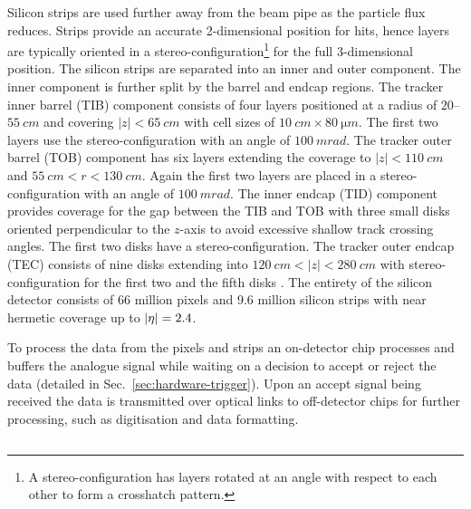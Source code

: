 Silicon strips are used further away from the beam pipe as the particle flux reduces. Strips provide an accurate 2-dimensional position for hits, hence layers are typically oriented in a stereo-configuration\footnote{A stereo-configuration has layers rotated at an angle with respect to each other to form a crosshatch pattern.} for the full 3-dimensional position. The silicon strips are separated into an inner and outer component. The inner component is further split by the barrel and endcap regions. The tracker inner barrel (TIB) component consists of four layers positioned at a radius of $20$--${\SI{55}{cm}}$ and covering ${|z|<\SI{65}{cm}}$ with cell sizes of ${\SI{10}{cm}\times\SI{80}{\micro m}}$. The first two layers use the stereo-configuration with an angle of ${\SI{100}{mrad}}$. The tracker outer barrel (TOB) component has six layers extending the coverage to ${|z|<\SI{110}{cm}}$ and ${\SI{55}{cm}<r<\SI{130}{cm}}$. Again the first two layers are placed in a stereo-configuration with an angle of ${\SI{100}{mrad}}$. The inner endcap (TID) component provides coverage for the gap between the TIB and TOB with three small disks oriented perpendicular to the $z$-axis to avoid excessive shallow track crossing angles. The first two disks have a stereo-configuration. The tracker outer endcap (TEC) consists of nine disks extending into ${\SI{120}{cm}<|z|<\SI{280}{cm}}$ with stereo-configuration for the first two  and the fifth disks \cite{Borrello:687861}. The entirety of the silicon detector consists of 66 million pixels and 9.6 million silicon strips with near hermetic coverage up to $|\eta|=2.4$.

To process the data from the pixels and strips an on-detector chip processes and buffers the analogue signal while waiting on a decision to accept or reject the data (detailed in Sec.~\ref{sec:hardware-trigger}). Upon an accept signal being received the data is transmitted over optical links to off-detector chips for further processing, such as digitisation and data formatting.


\subsection{\ECAL}

